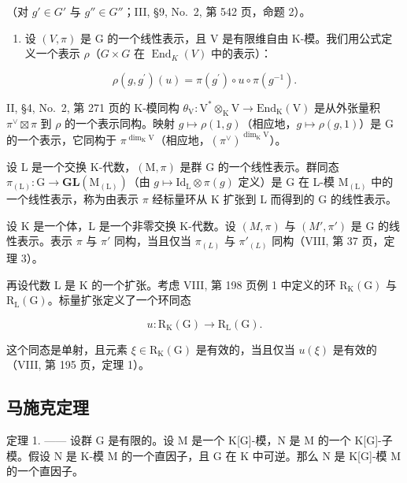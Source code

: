 （对 \(g' \in G'\) 与 \(g'' \in G''\)；III, §9, No.~2, 第 542 页，命题 2）。

\begin{enumerate}
\def\labelenumi{\arabic{enumi})}
\setcounter{enumi}{5}
\tightlist
\item
  设 \((V,\pi)\) 是 G 的一个线性表示，且 V 是有限维自由 K-模。我们用公式定义一个表示 \(\rho\)（\(G\times G\) 在 \(\operatorname{End}_{K}(V)\) 中的表示）：
\end{enumerate}

\[
\rho (g, g ^ {\prime}) (u) = \pi (g ^ {\prime}) \circ u \circ \pi (g ^ {- 1}).
\]

II, §4, No.~2, 第 271 页的 K-模同构 \(\theta_{\mathrm{V}}: \mathrm{V}^{*} \otimes_{\mathrm{K}} \mathrm{V} \to \mathrm{End}_{\mathrm{K}}(\mathrm{V})\) 是从外张量积 \(\pi^{\vee} \boxtimes \pi\) 到 \(\rho\) 的一个表示同构。映射 \(g \mapsto \rho(1, g)\)（相应地，\(g \mapsto \rho(g, 1)\)）是 G 的一个表示，它同构于 \(\pi^{\dim_{\mathrm{K}} \mathrm{V}}\)（相应地，\((\pi^{\vee})^{\dim_{\mathrm{K}} \mathrm{V}}\)）。

设 L 是一个交换 K-代数，\((\mathrm{M},\pi)\) 是群 G 的一个线性表示。群同态 \(\pi_{(\mathrm{L})}:\mathrm{G}\to\mathbf{GL}(\mathrm{M}_{(\mathrm{L})})\)（由 \(g\mapsto\mathrm{Id}_{\mathrm{L}}\otimes\pi(g)\) 定义）是 G 在 L-模 \(\mathrm{M}_{(\mathrm{L})}\) 中的一个线性表示，称为由表示 \(\pi\) 经标量环从 K 扩张到 L 而得到的 G 的线性表示。

设 K 是一个体，L 是一个非零交换 K-代数。设 \((M,\pi)\) 与 \((M',\pi')\) 是 G 的线性表示。表示 \(\pi\) 与 \(\pi'\) 同构，当且仅当 \(\pi_{(L)}\) 与 \(\pi'_{(L)}\) 同构（VIII, 第 37 页，定理 3）。

再设代数 L 是 K 的一个扩张。考虑 VIII, 第 198 页例 1 中定义的环 \(\mathrm{R}_{\mathrm{K}}(\mathrm{G})\) 与 \(\mathrm{R}_{\mathrm{L}}(\mathrm{G})\)。标量扩张定义了一个环同态

\[
u: \mathrm{R} _ {\mathrm{K}} (\mathrm{G}) \longrightarrow \mathrm{R} _ {\mathrm{L}} (\mathrm{G}).
\]

这个同态是单射，且元素 \(\xi \in \mathrm{R}_{\mathrm{K}}(\mathrm{G})\) 是有效的，当且仅当 \(u(\xi)\) 是有效的（VIII, 第 195 页，定理 1）。

\subsection{马施克定理}

定理 1. —— 设群 G 是有限的。设 M 是一个 K{[}G{]}-模，N 是 M 的一个 K{[}G{]}-子模。假设 N 是 K-模 M 的一个直因子，且 \textbar G\textbar{} 在 K 中可逆。那么 N 是 K{[}G{]}-模 M 的一个直因子。


